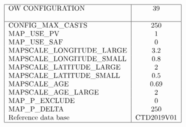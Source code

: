 \documentclass[11pt,titlepage]{article}
\begin{document}
\pagestyle{plain}
\begin{table}[h]
$$
\begin{tabular}{|l|c|}
\hline
OW CONFIGURATION 		& 39     	\\
				&                \\
\hline
CONFIG\_MAX\_CASTS		& 250     	\\
MAP\_USE\_PV			& 1       	\\
MAP\_USE\_SAF		        & 0        	\\
MAPSCALE\_LONGITUDE\_LARGE	& 3.2     	\\
MAPSCALE\_LONGITUDE\_SMALL	& 0.8        \\
MAPSCALE\_LATITUDE\_LARGE 	& 2           \\
MAPSCALE\_LATITUDE\_SMALL 	& 0.5      \\
MAPSCALE\_AGE		 	& 0.69    \\
MAPSCALE\_AGE\_LARGE		& 2    	\\
MAP\_P\_EXCLUDE		 	& 0      \\
MAP\_P\_DELTA		 	& 250      \\
Reference data base      	&  CTD2019V01   \\ 
\hline
\end{tabular}
$$
\label{tab3}
\end{table}
\end{document}
